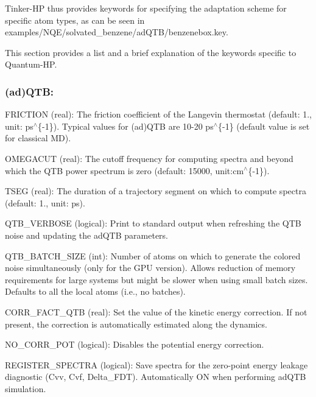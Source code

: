 Tinker-\/\-H\-P thus provides keywords for specifying the adaptation scheme for specific atom types, as can be seen in {\ttfamily examples/\-N\-Q\-E/solvated\-\_\-benzene/ad\-Q\-T\-B/benzenebox.\-key}. 



This section provides a list and a brief explanation of the keywords specific to Quantum-\/\-H\-P.

\subsubsection*{(ad)Q\-T\-B\-:}


\begin{DoxyItemize}
\item {\ttfamily F\-R\-I\-C\-T\-I\-O\-N} (real)\-: The friction coefficient of the Langevin thermostat (default\-: 1., unit\-: ps$^\wedge$\{-\/1\}). Typical values for (ad)Q\-T\-B are 10-\/20 ps$^\wedge$\{-\/1\} (default value is set for classical M\-D).
\item {\ttfamily O\-M\-E\-G\-A\-C\-U\-T} (real)\-: The cutoff frequency for computing spectra and beyond which the Q\-T\-B power spectrum is zero (default\-: 15000, unit\-:cm$^\wedge$\{-\/1\}).
\item {\ttfamily T\-S\-E\-G} (real)\-: The duration of a trajectory segment on which to compute spectra (default\-: 1., unit\-: ps).
\item {\ttfamily Q\-T\-B\-\_\-\-V\-E\-R\-B\-O\-S\-E} (logical)\-: Print to standard output when refreshing the Q\-T\-B noise and updating the ad\-Q\-T\-B parameters.
\item {\ttfamily Q\-T\-B\-\_\-\-B\-A\-T\-C\-H\-\_\-\-S\-I\-Z\-E} (int)\-: Number of atoms on which to generate the colored noise simultaneously (only for the G\-P\-U version). Allows reduction of memory requirements for large systems but might be slower when using small batch sizes. Defaults to all the local atoms (i.\-e., no batches).
\item {\ttfamily C\-O\-R\-R\-\_\-\-F\-A\-C\-T\-\_\-\-Q\-T\-B} (real)\-: Set the value of the kinetic energy correction. If not present, the correction is automatically estimated along the dynamics.
\item {\ttfamily N\-O\-\_\-\-C\-O\-R\-R\-\_\-\-P\-O\-T} (logical)\-: Disables the potential energy correction.
\item {\ttfamily R\-E\-G\-I\-S\-T\-E\-R\-\_\-\-S\-P\-E\-C\-T\-R\-A} (logical)\-: Save spectra for the zero-\/point energy leakage diagnostic (Cvv, Cvf, Delta\-\_\-\-F\-D\-T). Automatically O\-N when performing ad\-Q\-T\-B simulation.

\end{DoxyItemize}
